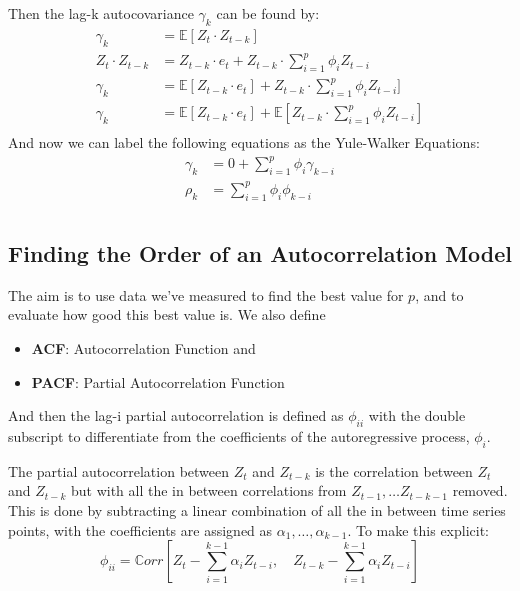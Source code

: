 Then the lag-k autocovariance $\gamma_{k}$ can be found by:
\begin{equation*}
    \begin{aligned}
        \gamma_{k} &= \mathbb{E}[Z_{t} \cdot Z_{t-k}] \\
        Z_{t} \cdot Z_{t-k} &= Z_{t-k} \cdot e_{t} + Z_{t-k}\cdot\sum_{i=1}^{p}
        \phi_{i}Z_{t-i} \\
        \gamma_{k} &= \mathbb{E}[Z_{t-k} \cdot e_{t}] + Z_{t-k}\cdot\sum_{i=1}^{p}
        \phi_{i}Z_{t-i}] \\
        \gamma_{k} &= \mathbb{E}[Z_{t-k} \cdot e_{t}]
        +\mathbb{E}\left[Z_{t-k}\cdot\sum_{i=1}^{p} \phi_{i}Z_{t-i}\right] \\
    \end{aligned}
\end{equation*}
And now we can label the following equations as the Yule-Walker Equations:
\begin{equation*}
    \begin{aligned}
    \gamma_{k} &= 0 + \sum_{i=1}^{p} \phi_{i}\gamma_{k-i} \\
    \rho_{k} &= \sum_{i=1}^{p} \phi_{i}\phi_{k-i} \\
    \end{aligned}
\end{equation*}

\subsection{Finding the Order of an Autocorrelation Model}
The aim is to use data we've measured to find the best value for $p$, and to
evaluate how good this best value is.
We also define 
\begin{itemize}
    \item \textbf{ACF}: Autocorrelation Function and 
    \item \textbf{PACF}: Partial Autocorrelation Function
\end{itemize}

And then the lag-i partial autocorrelation is defined as $\phi_{ii}$ with the
double subscript to differentiate from the coefficients of the autoregressive
process, $\phi_{i}$.

The partial autocorrelation between $Z_{t}$ and $Z_{t-k}$ is the correlation
between $Z_{t}$ and $Z_{t-k}$ but with all the in between correlations from
$Z_{t-1}, \dots Z_{t-k-1}$ removed. This is done by subtracting a linear
combination of all the in between time series points, with the coefficients are
assigned as $\alpha_{1}, \dots , \alpha_{k-1}$. To make this explicit:
\begin{equation*}
    \phi_{ii} = \mathbb{C}orr\left[Z_{t} - \sum_{i=1}^{k-1} \alpha_{i}
    Z_{t-i},\quad Z_{t-k} -
\sum_{i=1}^{k-1} \alpha_{i} Z_{t-i} \right]
\end{equation*}

